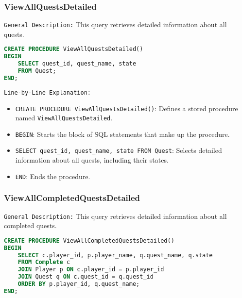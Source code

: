 \documentclass{article}
\begin{document}
\subsubsection{ViewAllQuestsDetailed}

\texttt{General Description:} This query retrieves detailed information about all quests.

\begin{lstlisting}[language=SQL]
CREATE PROCEDURE ViewAllQuestsDetailed()
BEGIN
    SELECT quest_id, quest_name, state
    FROM Quest;
END;
\end{lstlisting}

\texttt{Line-by-Line Explanation:}
\begin{itemize}
    \item \lstinline|CREATE PROCEDURE ViewAllQuestsDetailed()|: Defines a stored procedure named \linebreak \lstinline|ViewAllQuestsDetailed|.
    \item \lstinline|BEGIN|: Starts the block of SQL statements that make up the procedure.
    \item \lstinline|SELECT quest_id, quest_name, state FROM Quest|: Selects detailed information about all quests, including their states.
    \item \lstinline|END|: Ends the procedure.
\end{itemize}

\subsubsection{ViewAllCompletedQuestsDetailed}

\texttt{General Description:} This query retrieves detailed information about all completed quests.

\begin{lstlisting}[language=SQL]
CREATE PROCEDURE ViewAllCompletedQuestsDetailed()
BEGIN
    SELECT c.player_id, p.player_name, q.quest_name, q.state
    FROM Complete c
    JOIN Player p ON c.player_id = p.player_id
    JOIN Quest q ON c.quest_id = q.quest_id
    ORDER BY p.player_id, q.quest_name;
END;
\end{lstlisting}
\end{document}
